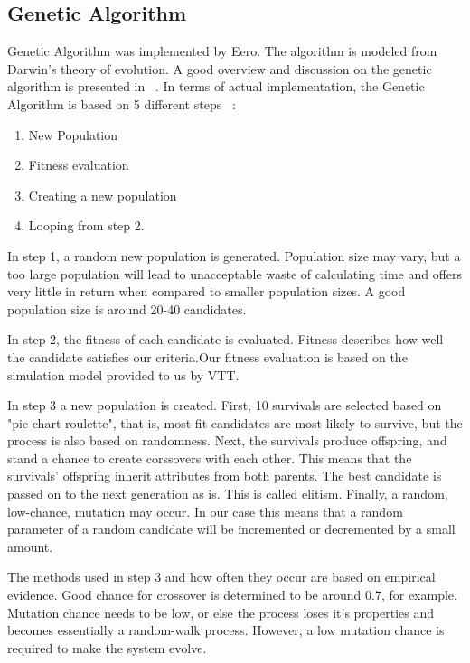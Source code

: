 \documentclass[twoside]{article}
\begin{document}
\begin{multicols}{2}
\section{Genetic Algorithm}

	Genetic Algorithm was implemented by Eero. The algorithm is modeled from Darwin’s theory of evolution. A good overview and discussion on the genetic algorithm is presented in ~\cite{mitchell}. In terms of actual implementation, the Genetic Algorithm is based on 5 different steps ~\cite{obitko}:
	\begin{enumerate} \itemsep1pt \parskip0pt 
	\item New Population
	\item Fitness evaluation
	\item Creating a new population
	\item Looping from step 2.
	\end{enumerate}
 	
	In step 1, a random new population is generated.  Population size may vary, but a too large population will lead to unacceptable waste of calculating time and offers very little in return when compared to smaller population sizes. A good population size is around 20-40 candidates.


	In step 2, the fitness of each candidate is evaluated.  Fitness describes how well the candidate satisfies our criteria.Our fitness evaluation is based on the simulation model provided to us by VTT.
	
	In step 3 a new population is created. First, 10 survivals are  selected based on "pie chart roulette", that is, most fit candidates are most likely to survive, but the process is also based on randomness. Next, the survivals produce offspring, and stand a chance to create corssovers with each other. This means that the survivals' offspring inherit attributes from both parents. The best candidate is passed on to the next generation as is. This is called elitism. Finally, a  random, low-chance, mutation may occur. In our case this means that a random parameter  of a random  candidate will be incremented or decremented by a small amount.
	
	The methods used in step 3 and how often they occur are based on empirical evidence. Good  chance for crossover is determined to be around 0.7, for example. Mutation chance needs to be low, or else the process loses it's properties and becomes essentially a random-walk process. However, a low mutation chance is required to make the system evolve.
	

\end{multicols}
\end{document}
